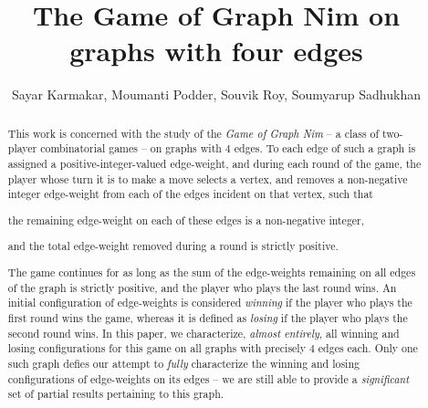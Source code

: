 \documentclass[11pt,reqno]{amsart}
\title[]{The Game of Graph Nim on graphs with four edges}
\date{}
\author{Sayar Karmakar, Moumanti Podder, Souvik Roy, Soumyarup Sadhukhan}
\theoremstyle{definition}
\theoremstyle{definition}
\begin{document}


\begin{abstract}
This work is concerned with the study of the \emph{Game of Graph Nim} -- a class of two-player combinatorial games -- on graphs with $4$ edges. To each edge of such a graph is assigned a positive-integer-valued edge-weight, and during each round of the game, the player whose turn it is to make a move selects a vertex, and removes a non-negative integer edge-weight from each of the edges incident on that vertex, such that
\begin{enumerate*}
\item the remaining edge-weight on each of these edges is a non-negative integer,
\item and the total edge-weight removed during a round is strictly positive.
\end{enumerate*}
The game continues for as long as the sum of the edge-weights remaining on all edges of the graph is strictly positive, and the player who plays the last round wins. An initial configuration of edge-weights is considered \emph{winning} if the player who plays the first round wins the game, whereas it is defined as \emph{losing} if the player who plays the second round wins. In this paper, we characterize, \emph{almost entirely}, all winning and losing configurations for this game on all graphs with precisely $4$ edges each. Only one such graph defies our attempt to \emph{fully} characterize the winning and losing configurations of edge-weights on its edges -- we are still able to provide a \emph{significant} set of partial results pertaining to this graph.  
\end{abstract}



\maketitle
\end{document}

